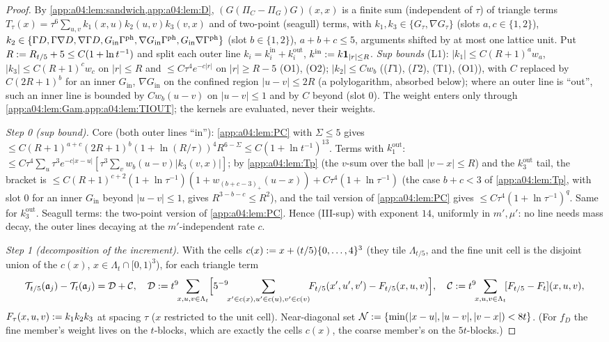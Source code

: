 \begin{proof}
By \cref{app:a04:lem:sandwich,app:a04:lem:D}, $(G(\Pi_C-\Pi_G)G)(x,x)$ is a finite sum (independent of $\tau$) of triangle terms $T_\tau(x)=\tau^6\sum_{u,v}k_1(x,u)k_2(u,v)k_3(v,x)$ and of two-point (seagull) terms, with $k_1,k_3\in\{G_\tau,\nabla G_\tau\}$ (slots $a,c\in\{1,2\}$), $k_2\in\{\Gamma D,\Gamma\nabla D,\nabla\Gamma D,G_{\mathrm{in}}\Gamma^{\mathrm{ph}},\nabla G_{\mathrm{in}}\Gamma^{\mathrm{ph}},G_{\mathrm{in}}\nabla\Gamma^{\mathrm{ph}}\}$ (slot $b\in\{1,2\}$), $a+b+c\le5$, arguments shifted by at most one lattice unit. Put $R:= R_{t/5}+5\le C(1+\ln t^{-1})$ and split each outer line $k_i=k_i^{\mathrm{in}}+k_i^{\mathrm{out}}$, $k^{\mathrm{in}}:= k\mathbf 1_{|r|\le R}$. \emph{Sup bounds} (L1): $|k_1|\le C(R+1)^aw_a$, $|k_3|\le C(R+1)^cw_c$ on $|r|\le R$ and $\le C\tau^4e^{-c|r|}$ on $|r|\ge R-5$ (O1), (O2); $|k_2|\le Cw_b$ (($\Gamma$1), ($\Gamma$2), (T1), (O1)), with $C$ replaced by $C(2R+1)^b$ for an inner $G_{\mathrm{in}}$, $\nabla G_{\mathrm{in}}$ on the confined region $|u-v|\le2R$ (a polylogarithm, absorbed below); where an outer line is ``out'', such an inner line is bounded by $Cw_b(u-v)$ on $|u-v|\le1$ and by $C$ beyond (slot $0$). The weight enters only through \cref{app:a04:lem:Gam,app:a04:lem:TIOUT}; the kernels are evaluated, never their weights.

\emph{Step 0 (sup bound).} Core (both outer lines ``in''): \cref{app:a04:lem:PC} with $\Sigma\le5$ gives $\le C(R+1)^{a+c}(2R+1)^b(1+\ln(R/\tau))^4R^{6-\Sigma}\le C(1+\ln t^{-1})^{13}$. Terms with $k_1^{\mathrm{out}}$: $\le C\tau^4\sum_u\tau^3e^{-c|x-u|}[\tau^3\sum_vw_b(u-v)|k_3(v,x)|]$; by \cref{app:a04:lem:Tp} (the $v$-sum over the ball $|v-x|\le R$) and the $k_3^{\mathrm{out}}$ tail, the bracket is $\le C(R+1)^{c+2}(1+\ln\tau^{-1})(1+w_{(b+c-3)_+}(u-x))+C\tau^4(1+\ln\tau^{-1})$ (the case $b+c<3$ of \cref{app:a04:lem:Tp}, with slot $0$ for an inner $G_{\mathrm{in}}$ beyond $|u-v|\le1$, gives $R^{3-b-c}\le R^2$), and the tail version of \cref{app:a04:lem:PC} gives $\le C\tau^4(1+\ln\tau^{-1})^{q}$. Same for $k_3^{\mathrm{out}}$. Seagull terms: the two-point version of \cref{app:a04:lem:PC}. Hence (III-sup) with exponent $14$, uniformly in $m',\mu'$: no line needs mass decay, the outer lines decaying at the $m'$-independent rate $c$.

\emph{Step 1 (decomposition of the increment).} With the cells $c(x):= x+(t/5)\{0,\dots,4\}^3$ (they tile $\Lambda_{t/5}$, and the fine unit cell is the disjoint union of the $c(x)$, $x\in\Lambda_t\cap[0,1)^3$), for each triangle term
\[
\cT_{t/5}(\mathfrak a_j)-\cT_t(\mathfrak a_j)=\cD+\cC,\quad
\cD\defeq t^9\!\!\sum_{x,u,v\in\Lambda_t}\!\Big[5^{-9}\!\!\sum_{x'\in c(x),u'\in c(u),v'\in c(v)}\!\!F_{t/5}(x',u',v')-F_{t/5}(x,u,v)\Big],\quad
\cC\defeq t^9\!\!\sum_{x,u,v\in\Lambda_t}\![F_{t/5}-F_t](x,u,v),
\]
$F_\tau(x,u,v):= k_1k_2k_3$ at spacing $\tau$ ($x$ restricted to the unit cell). Near-diagonal set $\mathcal N:=\{\min(|x-u|,|u-v|,|v-x|)<8t\}$. (For $f_D$ the fine member's weight lives on the $t$-blocks, which are exactly the cells $c(x)$, the coarse member's on the $5t$-blocks.)


\end{proof}
